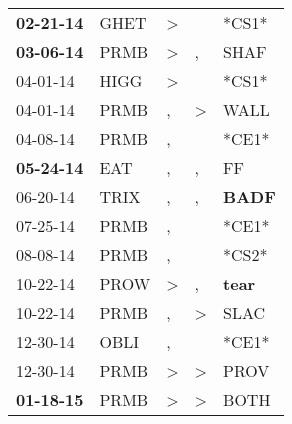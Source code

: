 \begin{supertabular}{p{0.07\textwidth}p{0.06\textwidth}p{0.02\textwidth}p{0.02\textwidth}p{0.06\textwidth}}
 \textbf{02-21-14\textsuperscript{}} &           GHET\textsuperscript{} &     \textgreater &                  &                            *CS1* \\
 \textbf{03-06-14\textsuperscript{}} &           PRMB\textsuperscript{} &     \textgreater &                , &           SHAF\textsuperscript{} \\
          04-01-14\textsuperscript{} &           HIGG\textsuperscript{} &     \textgreater &                  &                            *CS1* \\
          04-01-14\textsuperscript{} &           PRMB\textsuperscript{} &                , &     \textgreater &           WALL\textsuperscript{} \\
          04-08-14\textsuperscript{} &           PRMB\textsuperscript{} &                , &                  &                            *CE1* \\
 \textbf{05-24-14\textsuperscript{}} &            EAT\textsuperscript{} &                , &                , &             FF\textsuperscript{} \\
          06-20-14\textsuperscript{} &           TRIX\textsuperscript{} &                , &                , &  \textbf{BADF\textsuperscript{}} \\
          07-25-14\textsuperscript{} &           PRMB\textsuperscript{} &                , &                  &                            *CE1* \\
          08-08-14\textsuperscript{} &           PRMB\textsuperscript{} &                , &                  &                            *CS2* \\
          10-22-14\textsuperscript{} &           PROW\textsuperscript{} &     \textgreater &                , &  \textbf{tear\textsuperscript{}} \\
          10-22-14\textsuperscript{} &           PRMB\textsuperscript{} &                , &     \textgreater &           SLAC\textsuperscript{} \\
          12-30-14\textsuperscript{} &           OBLI\textsuperscript{} &                , &                  &                            *CE1* \\
          12-30-14\textsuperscript{} &           PRMB\textsuperscript{} &     \textgreater &     \textgreater &           PROV\textsuperscript{} \\
 \textbf{01-18-15\textsuperscript{}} &           PRMB\textsuperscript{} &     \textgreater &     \textgreater &           BOTH\textsuperscript{} \\

\end{supertabular}
